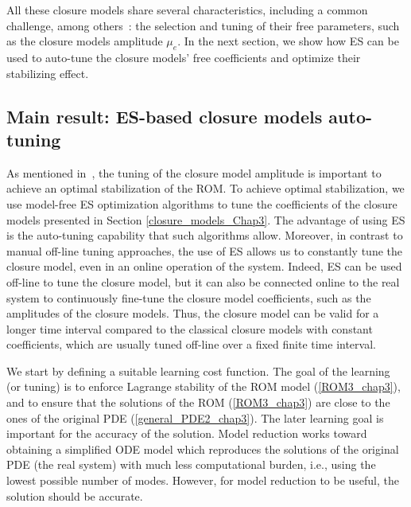 \documentclass[letterpaper,conference,onecolumn,11pt]{IEEEtran}
\begin{document}
All these closure models share several characteristics, including a
common challenge, among others~\cite{CNTLDBDN13,SB14}: the selection
and tuning of their free parameters, such as the closure models
amplitude $\mu_{e}$. In the next section, we show how ES can be used
to auto-tune the closure models' free coefficients and optimize their
stabilizing effect.


\subsection{Main result: ES-based closure models auto-tuning}
\label{MES-closure-tuning_chap3}
As mentioned in~\cite{SB14}, the tuning of the closure model amplitude
is important to achieve an optimal stabilization of the ROM. To
achieve optimal stabilization, we use model-free ES optimization
algorithms to tune the coefficients of the closure models presented in
Section \ref{closure_models_Chap3}. The advantage of using ES is the
auto-tuning capability that such algorithms allow. Moreover, in
contrast to manual off-line tuning approaches, the use of ES allows us
to constantly tune the closure model, even in an online operation of
the system. Indeed, ES can be used off-line to tune the closure model,
but it can also be connected online to the real system to continuously
fine-tune the closure model coefficients, such as the amplitudes of
the closure models. Thus, the closure model can be valid for a longer
time interval compared to the classical closure models with constant
coefficients, which are usually tuned off-line over a fixed finite
time interval.

We start by defining a suitable learning cost function. The goal of
the learning (or tuning) is to enforce Lagrange stability of the ROM
model (\ref{ROM3_chap3}), and to ensure that the solutions of the ROM
(\ref{ROM3_chap3}) are close to the ones of the original PDE
(\ref{general_PDE2_chap3}). The later learning goal is important for
the accuracy of the solution. Model reduction works toward obtaining a
simplified ODE model which reproduces the solutions of the original
PDE (the real system) with much less computational burden, i.e., using
the lowest possible number of modes. However, for model reduction to
be useful, the solution should be accurate.
\end{document}
